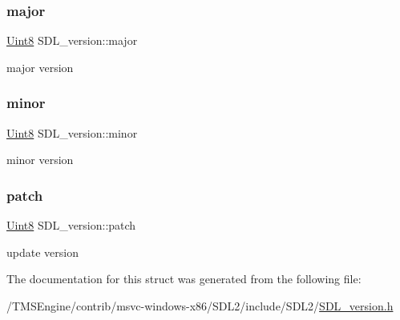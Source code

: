 \subsubsection{\texorpdfstring{major}{major}}
{\footnotesize\ttfamily \hyperlink{_s_d_l__stdinc_8h_a2944638813a090aa23e62f4da842c3e2}{Uint8} S\+D\+L\+\_\+version\+::major}

major version \mbox{\label{struct_s_d_l__version_a6c35c7bf80245028d5970e6a504ecf57}} 
\subsubsection{\texorpdfstring{minor}{minor}}
{\footnotesize\ttfamily \hyperlink{_s_d_l__stdinc_8h_a2944638813a090aa23e62f4da842c3e2}{Uint8} S\+D\+L\+\_\+version\+::minor}

minor version \mbox{\label{struct_s_d_l__version_aa6dacff18edee8cd037c773b843be0f1}} 
\subsubsection{\texorpdfstring{patch}{patch}}
{\footnotesize\ttfamily \hyperlink{_s_d_l__stdinc_8h_a2944638813a090aa23e62f4da842c3e2}{Uint8} S\+D\+L\+\_\+version\+::patch}

update version 

The documentation for this struct was generated from the following file\+:\begin{DoxyCompactItemize}
\item 
/\+T\+M\+S\+Engine/contrib/msvc-\/windows-\/x86/\+S\+D\+L2/include/\+S\+D\+L2/\hyperlink{_s_d_l__version_8h}{S\+D\+L\+\_\+version.\+h}\end{DoxyCompactItemize}
